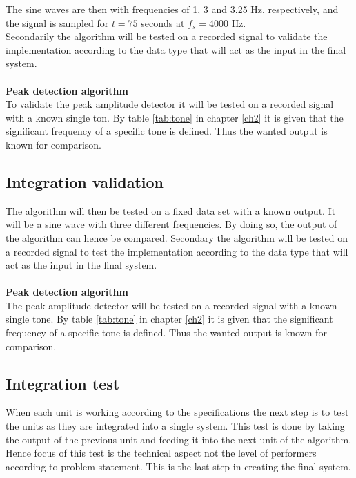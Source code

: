 The sine waves are then with frequencies of 1, 3 and 3.25 Hz, respectively, and the signal is sampled for $t=75$ seconds at $f_s=4000$ Hz.\\
Secondarily the algorithm will be tested on a recorded signal to validate the implementation according to the data type that will act as the input in the final system.\\\\
\textbf{Peak detection algorithm}\\
To validate the peak amplitude detector it will be tested on a recorded signal with a known single ton. By table \ref{tab:tone} in chapter \ref{ch2} it is given that the significant frequency of a specific tone is defined. Thus the wanted output is known for comparison.         
\subsection{Integration validation}
The algorithm will then be tested on a fixed data set with a known output. It will be a sine wave with three different frequencies. By doing so, the output of the algorithm can hence be compared.
Secondary the algorithm will be tested on a recorded signal to test the implementation according to the data type that will act as the input in the final system. 
\\
\\
\textbf{Peak detection algorithm}\\
The peak amplitude detector will be tested on a recorded signal with a known single tone. By table \ref{tab:tone} in chapter \ref{ch2} it is given that the significant frequency of a specific tone is defined. Thus the wanted output is known for comparison.         

\subsection{Integration test}
When each unit is working according to the specifications the next step is to test the units as they are integrated into a single system. This test is done by taking the output of the previous unit and feeding it into the next unit of the algorithm. Hence focus of this test is the technical aspect not the level of performers according to problem statement. This is the last step in creating the final system.

